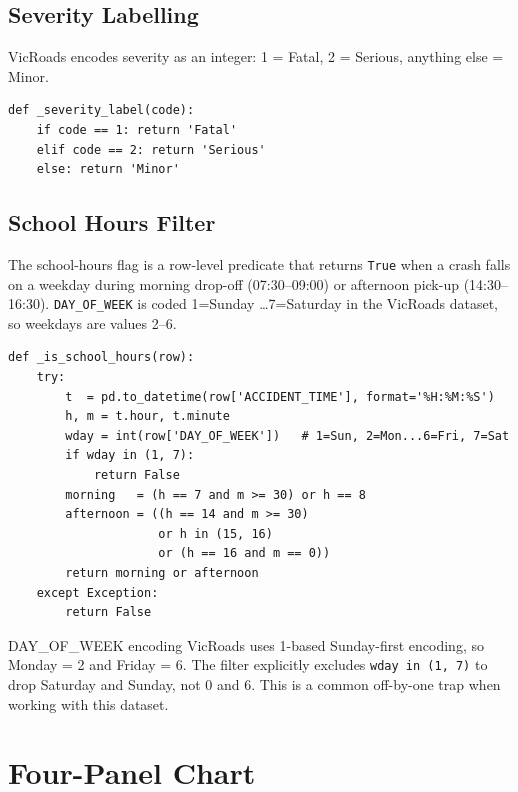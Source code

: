 \documentclass[11pt,a4paper,openany]{book}
\begin{document}
\subsection{Severity Labelling}

VicRoads encodes severity as an integer: 1 = Fatal, 2 = Serious, anything else = Minor.

\begin{lstlisting}[style=python, caption={Severity mapping function.}]
def _severity_label(code):
    if code == 1: return 'Fatal'
    elif code == 2: return 'Serious'
    else: return 'Minor'
\end{lstlisting}

\subsection{School Hours Filter}

The school-hours flag is a row-level predicate that returns \texttt{True} when a crash
falls on a weekday during morning drop-off (07:30--09:00) or afternoon pick-up (14:30--16:30).
\texttt{DAY\_OF\_WEEK} is coded 1=Sunday \ldots 7=Saturday in the VicRoads dataset, so
weekdays are values 2--6.

\begin{lstlisting}[style=python, caption={School-hours predicate.}]
def _is_school_hours(row):
    try:
        t  = pd.to_datetime(row['ACCIDENT_TIME'], format='%H:%M:%S')
        h, m = t.hour, t.minute
        wday = int(row['DAY_OF_WEEK'])   # 1=Sun, 2=Mon...6=Fri, 7=Sat
        if wday in (1, 7):
            return False
        morning   = (h == 7 and m >= 30) or h == 8
        afternoon = ((h == 14 and m >= 30)
                     or h in (15, 16)
                     or (h == 16 and m == 0))
        return morning or afternoon
    except Exception:
        return False
\end{lstlisting}

\begin{warnbox}{DAY\_OF\_WEEK encoding}
VicRoads uses 1-based Sunday-first encoding, so Monday = 2 and Friday = 6.
The filter explicitly excludes \texttt{wday in (1, 7)} to drop Saturday and Sunday,
not 0 and 6.  This is a common off-by-one trap when working with this dataset.
\end{warnbox}

\section{Four-Panel Chart}
\end{document}
